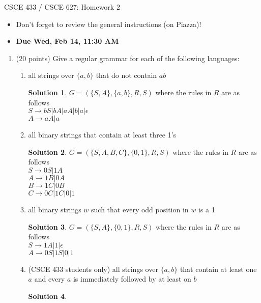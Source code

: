 \documentclass[12pt]{article}
\theoremstyle{definition}
\newtheorem*{solution}{Solution}
\begin{document}
\begin{center}
CSCE 433 / CSCE 627:  Homework 2 \\
\end{center}

\begin{itemize}
\item Don't forget to review the general instructions (on Piazza)!

\item {\bf Due Wed, Feb 14, 11:30 AM}
\end{itemize}

\begin{enumerate}

\item (20 points) Give a regular grammar for each of the following
languages:
  \begin{enumerate}
  \item all strings over $\{a,b\}$ that do not contain $ab$
\begin{solution}
	$G = (\{S,A\}, \{a,b\}, R, S)$ where the rules in $R$ are as follows\\ 
	$S \rightarrow bS | bA | aA | b | a | \epsilon$ \\ 
	$A \rightarrow aA |a$ \\
	\end{solution}
  \item all binary strings that contain at least three 1's
  \begin{solution}
	$G = (\{S,A,B,C\}, \{0,1\}, R, S)$ where the rules in $R$ are as follows\\ 
	$S \rightarrow 0S | 1A $ \\ 
	$A \rightarrow 1B | 0A$ \\
	$B \rightarrow 1C | 0B$ \\
	$C \rightarrow 0C | 1C | 0 | 1$
	\end{solution}
  \item all binary strings $w$ such that every odd position in $w$ is a 1
    \begin{solution}
	$G = (\{S, A\}, \{0,1\}, R, S)$ where the rules in $R$ are as follows\\ 
	$S \rightarrow 1A | 1 | \epsilon$ \\ 
	$A \rightarrow 0S| 1S | 0 | 1$ 
	\end{solution}
  \item (CSCE 433 students only) all strings over $\{a,b\}$ that contain
        at least one $a$ and every $a$ is immediately followed by at least
        on $b$
	\begin{solution}

\end{solution}
\end{enumerate}
\end{enumerate}
\end{document}
